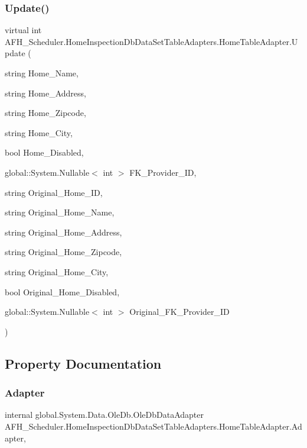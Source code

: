 \subsubsection{Update()\hspace{0.1cm}{\footnotesize\ttfamily [6/6]}}
{\footnotesize\ttfamily virtual int A\+F\+H\+\_\+\+Scheduler.\+Home\+Inspection\+Db\+Data\+Set\+Table\+Adapters.\+Home\+Table\+Adapter.\+Update (\begin{DoxyParamCaption}\item[{string}]{Home\+\_\+\+Name,  }\item[{string}]{Home\+\_\+\+Address,  }\item[{string}]{Home\+\_\+\+Zipcode,  }\item[{string}]{Home\+\_\+\+City,  }\item[{bool}]{Home\+\_\+\+Disabled,  }\item[{global\+::\+System.\+Nullable$<$ int $>$}]{F\+K\+\_\+\+Provider\+\_\+\+ID,  }\item[{string}]{Original\+\_\+\+Home\+\_\+\+ID,  }\item[{string}]{Original\+\_\+\+Home\+\_\+\+Name,  }\item[{string}]{Original\+\_\+\+Home\+\_\+\+Address,  }\item[{string}]{Original\+\_\+\+Home\+\_\+\+Zipcode,  }\item[{string}]{Original\+\_\+\+Home\+\_\+\+City,  }\item[{bool}]{Original\+\_\+\+Home\+\_\+\+Disabled,  }\item[{global\+::\+System.\+Nullable$<$ int $>$}]{Original\+\_\+\+F\+K\+\_\+\+Provider\+\_\+\+ID }\end{DoxyParamCaption})\hspace{0.3cm}{\ttfamily [virtual]}}



\subsection{Property Documentation}
\mbox{\label{class_a_f_h___scheduler_1_1_home_inspection_db_data_set_table_adapters_1_1_home_table_adapter_afeb12064b1815fd65bb9cdceddd3f6e3}} 
\subsubsection{Adapter}
{\footnotesize\ttfamily internal global.\+System.\+Data.\+Ole\+Db.\+Ole\+Db\+Data\+Adapter A\+F\+H\+\_\+\+Scheduler.\+Home\+Inspection\+Db\+Data\+Set\+Table\+Adapters.\+Home\+Table\+Adapter.\+Adapter\hspace{0.3cm}{\ttfamily [get]}, {\ttfamily [protected]}}

